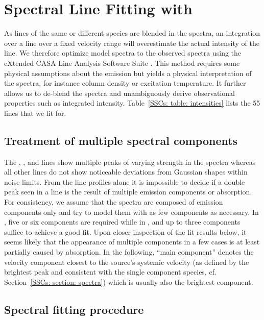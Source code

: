
\section{Spectral Line Fitting with \xclass}\label{SSCs: section: spectral line fitting}

As lines of the same or different species are blended in the spectra, an integration over a line over a fixed velocity range will overestimate the actual intensity of the line. We therefore optimize model spectra to the observed spectra using the eXtended CASA Line Analysis Software Suite \citep[\xclass\footnote{\url{https://xclass.astro.uni-koeln.de/Home}},][]{2018ascl.soft10016M}. This method requires some physical assumptions about the emission but yields a physical interpretation of the spectra, for instance column density or excitation temperature. It further allows us to de-blend the spectra and unambiguously derive observational properties such as integrated intensity.
Table~\ref{SSCs: table: intensities} lists the 55 lines that we fit for.

\subsection{Treatment of multiple spectral components}
The , \hcn, \hco and \cs lines show multiple peaks of varying strength in the spectra whereas all other lines do not show noticeable deviations from Gaussian shapes within noise limits. From the line profiles alone it is impossible to decide if a double peak seen in a line is the result of multiple emission components or absorption. For consistency, we assume that the spectra are composed of emission components only and try to model them with as few components as necessary. In , five or six components are required while in \hcn, \hco and \cs up to three components suffice to achieve a good fit. Upon closer inspection of the fit results below, it seems likely that the appearance of multiple components in a few cases is at least partially caused by absorption.
In the following, ``main component'' denotes the velocity component closest to the source's systemic velocity (as defined by the brightest \cs peak and consistent with the single component species, cf. Section~\ref{SSCs: section: spectra}) which is usually also the brightest component.


\subsection{Spectral fitting procedure}
\label{SSCs: section: spectral fitting procedure}

